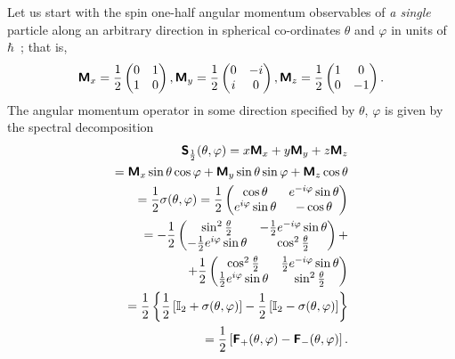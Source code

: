 \documentclass[%
  twocolumn,
 showpacs,
 showkeys,
 preprintnumbers,
 amsmath,amssymb,
 aps,
  pra,
  longbibliography,
 floatfix,
 ]{revtex4-1}
\begin{document}
Let us start with the spin one-half angular momentum observables of {\em a single} particle along an arbitrary direction
in spherical co-ordinates $\theta$ and $\varphi$
in units of $\hbar$~\cite{schiff-55};
that is,
\begin{equation}
\textsf{\textbf{M}}_x=
\frac{1}{2}
\begin{pmatrix}
0&1\\
1&0
\end{pmatrix},
\textsf{\textbf{M}}_y=
\frac{1}{2}
\begin{pmatrix}
0&-i\\
i&0
\end{pmatrix},
\textsf{\textbf{M}}_z=
\frac{1}{2}
\begin{pmatrix}
1&0\\
0&-1
\end{pmatrix}.
\end{equation}
The angular momentum operator in some direction specified by $\theta$, $\varphi$ is given by the spectral decomposition
\begin{equation}
\begin{split}
\textsf{\textbf{S}}_\frac{1}{2} (\theta ,\varphi)=
x \textsf{\textbf{M}}_x
+
y \textsf{\textbf{M}}_y
+
z \textsf{\textbf{M}}_z
\\
=
 \textsf{\textbf{M}}_x   \sin \theta \cos \varphi
+
   \textsf{\textbf{M}}_y    \sin \theta \sin \varphi
+
  \textsf{\textbf{M}}_z   \cos \theta
\\
=   \frac{1}{2}\sigma (\theta ,\varphi)=
{1\over 2}
\begin{pmatrix}
\cos \theta &  e^{-i \varphi }\sin \theta \\
e^{i \varphi }\sin \theta & - \cos \theta
\end{pmatrix}\\
=
-
\frac{1}{2}
\begin{pmatrix}
 \sin ^2 \frac{\theta }{2} & -\frac{1}{2} e^{-i \varphi } \sin \theta  \\
 -\frac{1}{2} e^{i \varphi } \sin \theta  & \cos ^2\frac{\theta  }{2}
\end{pmatrix}
+\\
+
\frac{1}{2}
\begin{pmatrix}
 \cos ^2 \frac{\theta }{2} & \frac{1}{2} e^{-i \varphi } \sin \theta  \\
 \frac{1}{2} e^{i \varphi } \sin \theta  & \sin ^2 \frac{\theta }{2}
\end{pmatrix}\\
=
\frac{1}{2}
\left\{
\frac{1}{2}
\left[
{\Bbb I}_2 + \sigma (\theta ,\varphi)
\right]
-
\frac{1}{2}
\left[
{\Bbb I}_2 - \sigma (\theta ,\varphi)
\right]
\right\} \\
=
\frac{1}{2}
\left[
\textsf{\textbf{F}}_+ (\theta ,\varphi )
-
\textsf{\textbf{F}}_- (\theta ,\varphi )
\right]
.
\end{split}
\label{e-2009-gtq-s2}
\end{equation}
\end{document}
